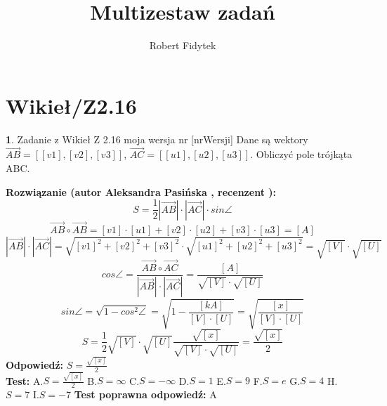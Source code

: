 \documentclass[12pt, a4paper]{article}
\title{Multizestaw zadań}
\author{Robert Fidytek}
\date{}
\theoremstyle{definition} %
\newtheorem{zad}{}
\newcommand{\kategoria}[1]{\section{#1}} %
\newcommand{\zadStart}[1]{\begin{zad}#1\newline} %
\newcommand{\zadStop}{\end{zad}}   %
\newcommand{\rozwStart}[2]{\noindent \textbf{Rozwiązanie (autor #1 , recenzent #2): }\newline} %
\newcommand{\rozwStop}{\newline}                                            %
\newcommand{\odpStart}{\noindent \textbf{Odpowiedź:}\newline}    %
\newcommand{\odpStop}{\newline}                                             %
\newcommand{\testStart}{\noindent \textbf{Test:}\newline} %
\newcommand{\testStop}{\newline} %
\newcommand{\kluczStart}{\noindent \textbf{Test poprawna odpowiedź:}\newline} %
\newcommand{\kluczStop}{\newline} %
\begin{document}
\maketitle


\kategoria{Wikieł/Z2.16}
\zadStart{Zadanie z Wikieł Z 2.16 moja wersja nr [nrWersji]}
Dane są wektory $\overrightarrow{AB}=[[v1],[v2],[v3]]$, $\overrightarrow{AC}=[[u1],[u2],[u3]]$. Obliczyć pole trójkąta ABC.
\zadStop
\rozwStart{Aleksandra Pasińska}{}
$$S=\frac{1}{2}|\overrightarrow{AB}|\cdot |\overrightarrow{AC}|\cdot sin\angle$$
$$\overrightarrow{AB}\circ \overrightarrow{AB}=[v1]\cdot [u1]+[v2]\cdot [u2]+[v3]\cdot [u3]=[A]$$
$$|\overrightarrow{AB}|\cdot |\overrightarrow{AC}|=\sqrt{[v1]^2+[v2]^2+[v3]^2}\cdot \sqrt{[u1]^2+[u2]^2+[u3]^2}=\sqrt{[V]}\cdot\sqrt{[U]}$$
$$cos\angle=\frac{\overrightarrow{AB}\circ \overrightarrow{AC}}{|\overrightarrow{AB}|\cdot |\overrightarrow{AC}|} =\frac{[A]}{\sqrt{[V]}\cdot \sqrt{[U]}}$$
$$sin\angle=\sqrt{1-cos^2\angle}=\sqrt{1-\frac{[kA]}{[V]\cdot [U]}}=\sqrt{\frac{[x]}{[V]\cdot [U]}}$$
$$S=\frac{1}{2}\sqrt{[V]}\cdot\sqrt{[U]}\frac{\sqrt{[x]}}{\sqrt{[V]}\cdot \sqrt{[U]}}=\frac{\sqrt{[x]}}{2}$$
\rozwStop
\odpStart
$S=\frac{\sqrt{[x]}}{2}$\\
\odpStop
\testStart
A.$S=\frac{\sqrt{[x]}}{2}$
B.$S=\infty$
C.$S=-\infty$
D.$S=1$
E.$S=9$
F.$S=e$
G.$S=4$
H.$S=7$
I.$S=-7$
\testStop
\kluczStart
A
\kluczStop
\end{document}
